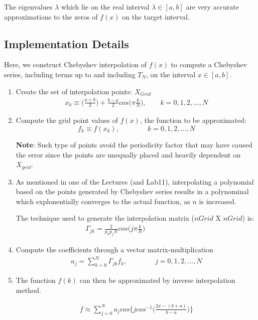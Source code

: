 \documentclass[12pt]{article}
\begin{document}
The eigenvalues $\lambda$ which lie on the real interval $\lambda \in [a, b]$ are very accurate approximations to the zeros of $f(x)$ on the target interval.

\newpage
\subsection*{Implementation Details}
Here, we construct Chebyshev interpolation of $f(x)$ to compute a Chebyshev series, including terms up to 
and including $T_N$, on the interval $x \in [a, b]$.

\begin{enumerate}
	\item Create the set of interpolation points: $X_{Grid}$
	\begin{align}
		x_k \equiv \Big(\frac{a+b}{2}\Big) + \frac{b-a}{2}cos\Big(\pi\frac{k}{N}\Big), \qquad  k = 0, 1, 2 ,..., N
	\end{align}
	
	\item Compute the grid point values of $f(x)$, the function to be approximated:
	\begin{equation}
		f_k \equiv f(x_k), \qquad \qquad k = 0, 1, 2 ,..., N
	\end{equation}
	
	\textbf{Note}: Such type of points avoid the periodicity factor that may have caused the error since
	the points are unequally placed and heavily dependent on $X_{grid}$.
	
	\item As mentioned in one of the Lectures (and Lab11), interpolating a polynomial based on
	the points generated by Chebyshev series results in a polynominal which explonentially converges to
	the actual function, as $n$ is increased.
	
	The technique used to generate the interpolation matrix ($nGrid$ X $nGrid$) is:
	\begin{align}
		\Gamma_{jk} = \frac{2}{p_kp_jN} cos \Big(j\pi\frac{k}{N}\Big) \qquad \qquad \qquad
	\end{align}
	
	\item Compute the coefficients through a vector matrix-multiplication
	\begin{align}
		a_j = \sum_{k=0}^{N} \Gamma_{jk}f_k, \qquad \qquad j = 0, 1, 2, ..., N
	\end{align}
	
	\item The function $f(k)$ can then be approximated by inverse interpolation method.
	
	\begin{align}
		f \approx \sum_{j=0}^{N} a_j cos \bigg\{j cos^{-1}\bigg(\frac{2x - (b + a)}{b - a}\bigg)\bigg\}
	\end{align}
 
\end{enumerate}
\end{document}

